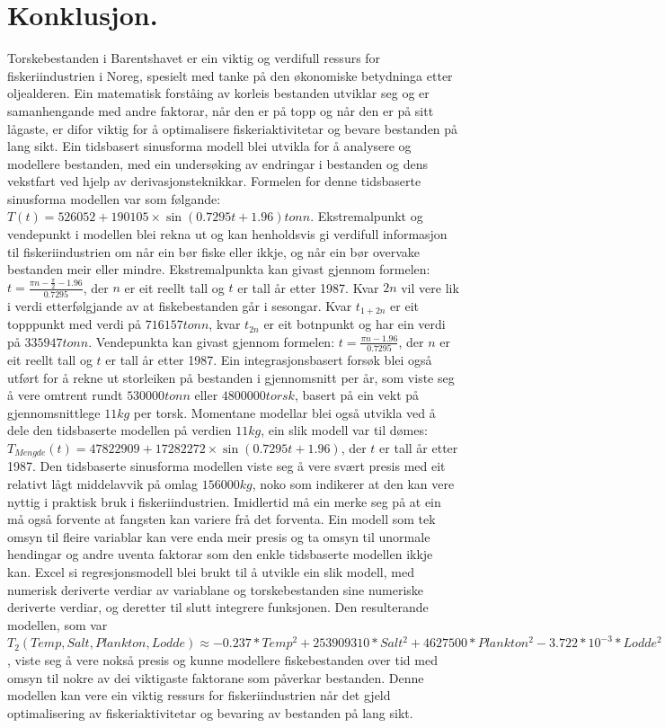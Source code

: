 \documentclass{report}
\begin{document}
\chapter{Konklusjon.}
Torskebestanden i Barentshavet er ein viktig og verdifull ressurs for fiskeriindustrien i Noreg, spesielt med tanke på den økonomiske betydninga etter oljealderen. Ein matematisk forståing av korleis bestanden utviklar seg og er samanhengande med andre faktorar, når den er på topp og når den er på sitt lågaste, er difor viktig for å optimalisere fiskeriaktivitetar og bevare bestanden på lang sikt.
Ein tidsbasert sinusforma modell blei utvikla for å analysere og modellere bestanden, med ein undersøking av endringar i bestanden og dens vekstfart ved hjelp av derivasjonsteknikkar.
Formelen for denne tidsbaserte sinusforma modellen var som følgande: $T(t) = 526052+190105\times \sin(0.7295t+1.96)tonn$.
Ekstremalpunkt og vendepunkt i modellen blei rekna ut og kan henholdsvis gi verdifull informasjon til fiskeriindustrien om når ein bør fiske eller ikkje, og når ein bør overvake bestanden meir eller mindre.
Ekstremalpunkta kan givast gjennom formelen: $t=\frac{\pi n - \frac{\pi}{2}-1.96}{0.7295}$, der $n$ er eit reellt tall og $t$ er tall år etter 1987. 
Kvar $2n$ vil vere lik i verdi etterfølgjande av at fiskebestanden går i sesongar.
Kvar $t_{1+2n}$ er eit topppunkt med verdi på $716157tonn$, kvar $t_{2n}$ er eit botnpunkt og har ein verdi på $335947tonn$.
Vendepunkta kan givast gjennom formelen: $t=\frac{\pi n -1.96}{0.7295}$, der $n$ er eit reellt tall og $t$ er tall år etter 1987.
Ein integrasjonsbasert forsøk blei også utført for å rekne ut storleiken på bestanden i gjennomsnitt per år, som viste seg å vere omtrent rundt $530000tonn$ eller $4800000 torsk$, basert på ein vekt på gjennomsnittlege $11kg$ per torsk.
Momentane modellar blei også utvikla ved å dele den tidsbaserte modellen på verdien $11kg$, ein slik modell var til dømes: $T_{Mengde}(t)=47822909+17282272\times \sin(0.7295t+1.96)$, der $t$ er tall år etter 1987.
Den tidsbaserte sinusforma modellen viste seg å vere svært presis med eit relativt lågt middelavvik på omlag $156000kg$, noko som indikerer at den kan vere nyttig i praktisk bruk i fiskeriindustrien. Imidlertid må ein merke seg på at ein må også forvente at fangsten kan variere frå det forventa.
Ein modell som tek omsyn til fleire variablar kan vere enda meir presis og ta omsyn til unormale hendingar og andre uventa faktorar som den enkle tidsbaserte modellen ikkje kan. Excel si regresjonsmodell blei brukt til å utvikle ein slik modell, med numerisk deriverte verdiar av variablane og torskebestanden sine numeriske deriverte verdiar, og deretter til slutt integrere funksjonen.
Den resulterande modellen, som var $T_{2}(Temp,Salt,Plankton,Lodde) \approx -0.237*Temp^2 + 253909310*Salt^2 + 4627500*Plankton^2 -3.722*10^{-3}*Lodde^2 + 531481$, viste seg å vere nokså presis og kunne modellere fiskebestanden over tid med omsyn til nokre av dei viktigaste faktorane som påverkar bestanden.
Denne modellen kan vere ein viktig ressurs for fiskeriindustrien når det gjeld optimalisering av fiskeriaktivitetar og bevaring av bestanden på lang sikt.
\end{document}

